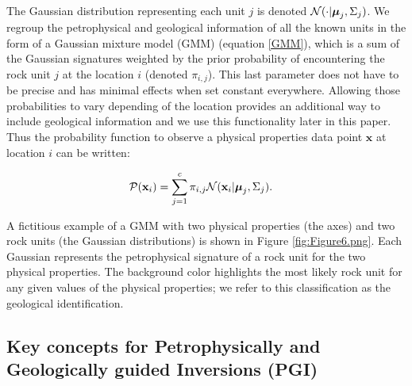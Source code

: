 \documentclass[paper, twocolumn]{geophysics} %
\newcommand{\mitbf}[1]{
  \hbox{\mathversion{bold}$#1$}}
\begin{document}
The Gaussian distribution representing each unit $j$ is denoted $\mathcal{N}(\cdot | \mitbf{\mu}_j, \Sigma_j)$. We regroup the petrophysical and geological information of all the known units in the form of a Gaussian mixture model (GMM) (equation \ref{GMM}), which is a sum of the Gaussian signatures weighted by the prior probability of encountering the rock unit $j$ at the location $i$ (denoted $\pi_{i,j}$). This last parameter does not have to be precise and has minimal effects when set constant everywhere. Allowing those probabilities to vary depending of the location provides an additional way to include geological information \citep{Giraud2017} and we use this functionality later in this paper. Thus the probability function to observe a physical properties data point $\mathbf{x}$ at location $i$ can be written:

\begin{align}
&\mathcal{P}(\mathbf{x}_i) = \sum_{j=1}^c \pi_{i,j} \mathcal{N}(\mathbf{x}_i|\mitbf{\mu}_j,\Sigma_j). \label{GMM}
\end{align}

A fictitious example of a GMM with two physical properties (the axes) and two rock units (the Gaussian distributions) is shown in Figure \ref{fig:Figure6.png}. Each Gaussian represents the petrophysical signature of a rock unit for the two physical properties. The background color highlights the most likely rock unit for any given values of the physical properties; we refer to this classification as the geological identification.



\subsection{Key concepts for Petrophysically and Geologically guided Inversions (PGI)}
\end{document}

